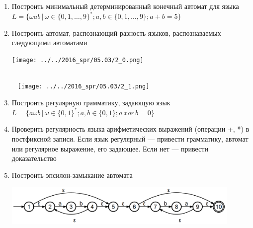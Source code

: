 \documentclass[12pt]{article}
\begin{document}
\begin{enumerate}
  \item Построить минимальный детерминированный конечный автомат для языка \\ $L = \{ \omega a b \, | \, \omega \in \{ 0, 1, \dots, 9 \}^*; a, b \in \{ 0, 1, \dots, 9 \}; a + b = 5 \} $
  \item { 
         Построить автомат, распознающий разность языков, распознаваемых следующими автоматами
         
         \texttt{[image: ../../2016\_spr/05.03/2\_0.png]}
         
~\\~
         \texttt{[image: ../../2016\_spr/05.03/2\_1.png]} 
        }
    \item Построить регулярную грамматику, задающую язык \\ $L = \{ a \omega b \, | \, \omega \in \{ 0, 1 \}^*; a, b \in \{ 0, 1 \}; a \, xor \, b = 0 \} $
    \item Проверить регулярность языка арифметических выражений (операции +, *) в постфиксной записи. Если язык регулярный --- привести грамматику, автомат или регулярное выражение, его задающее. Если нет --- привести доказательство
    \item {Построить эпсилон-замыкание автомата
           
           \includegraphics[width=0.9\textwidth]{test1b_ec.PNG}
    }
\end{enumerate}

\pagebreak 
\end{document}
